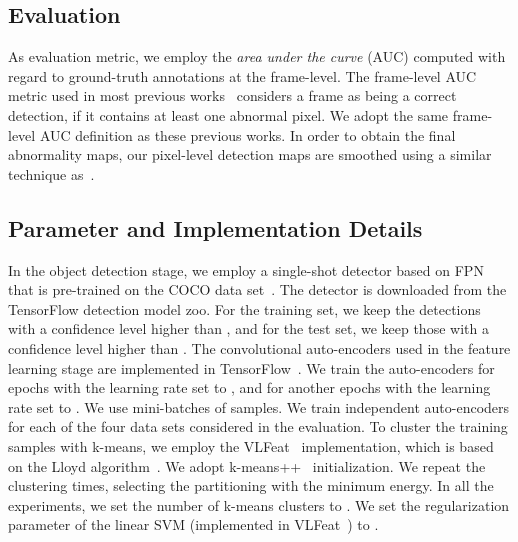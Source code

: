 \documentclass[10pt,twocolumn,letterpaper]{article}
\begin{document}
\vspace*{-0.1cm}
\subsection{Evaluation}
\vspace*{-0.1cm}

As evaluation metric, we employ the \emph{area under the curve} (AUC) computed with regard to ground-truth annotations at the frame-level. The frame-level AUC metric used in most previous works~\cite{Cong-CVPR-2011,Giorno-ECCV-2016,Ionescu-ICCV-2017,Ionescu-WACV-2019,Liu-CVPR-2018,Liu-BMVC-2018,Lu-ICCV-2013,Luo-ICCV-2017,Mahadevan-CVPR-2010,Sultani-CVPR-2018,Xu-BMVC-2015} considers a frame as being a correct detection, if it contains at least one abnormal pixel.
We adopt the same frame-level AUC definition as these previous works.  In order to obtain the final abnormality maps, our pixel-level detection maps are smoothed using a similar technique as~\cite{Giorno-ECCV-2016,Ionescu-ICCV-2017,Lu-ICCV-2013}. 

\vspace*{-0.1cm}
\subsection{Parameter and Implementation Details}
\vspace*{-0.1cm}

In the object detection stage, we employ a single-shot detector based on FPN~\cite{Lin-CVPR-2017} that is pre-trained on the COCO data set~\cite{Lin-ECCV-2014}. The detector is downloaded from the TensorFlow detection model zoo. For the training set, we keep the detections with a confidence level higher than , and for the test set, we keep those with a confidence level higher than . The convolutional auto-encoders used in the feature learning stage are implemented in TensorFlow~\cite{Abadi-OSDI-2016}. We train the auto-encoders for  epochs with the learning rate set to , and for another  epochs with the learning rate set to . We use mini-batches of  samples. We train independent auto-encoders for each of the four data sets considered in the evaluation. To cluster the training samples with k-means, we employ the VLFeat~\cite{vedaldi-vlfeat-2008} implementation, which is based on the Lloyd algorithm~\cite{Du-SIAM-1999}. We adopt k-means++~\cite{Arthur-SODA-2007} initialization. We repeat the clustering  times, selecting the partitioning with the minimum energy. In all the experiments, we set the number of k-means clusters to . We set the regularization parameter of the linear SVM (implemented in VLFeat~\cite{vedaldi-vlfeat-2008}) to .
\end{document}
